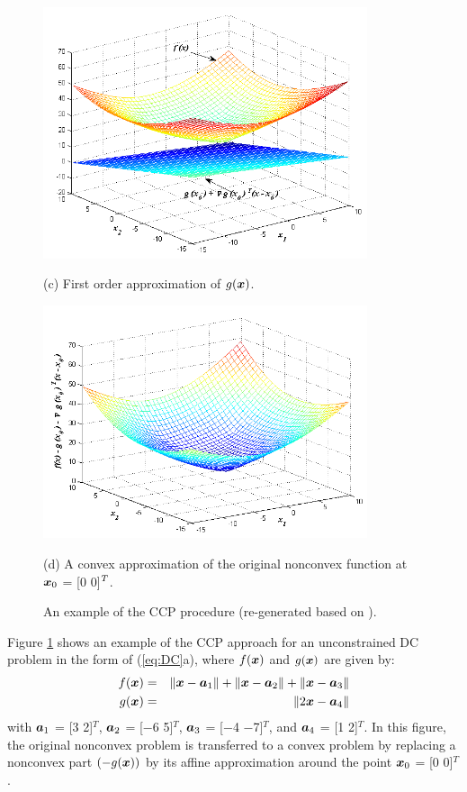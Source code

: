 \begin{figure}%
\centering
  \includegraphics[width=0.85\textwidth,height=0.45\textheight]{figures/ccp/ccp_c}
  
  (c) First order approximation of $g(\protect\mbox{\boldmath$x$})$.%
  
  \includegraphics[width=0.85\textwidth,height=0.45\textheight]{figures/ccp/ccp_d}
  
  (d) A convex approximation of the original nonconvex function at $\protect\mbox{\boldmath$x$}_0$ = [0 0]$\protect^T$. 
\caption{An example of the CCP procedure (re-generated based on \cite{clock}).}
\label{fig:ExampleCCP}
\end{figure}

Figure \ref{fig:ExampleCCP} shows an example of the CCP approach for an unconstrained DC problem in the form of (\ref{eq:DC}a), where $f(\mbox{\boldmath$x$})$ and  $g(\mbox{\boldmath$x$})$ are given by:
\begin{eqnarray}
\nonumber
f(\mbox{\boldmath$x$}) & = & \|\mbox{\boldmath$x$} - \mbox{\boldmath$a$}_1\| + \|\mbox{\boldmath$x$} - \mbox{\boldmath$a$}_2\| + \|\mbox{\boldmath$x$} - \mbox{\boldmath$a$}_3\| \\
\nonumber
g(\mbox{\boldmath$x$}) & = & \|2\mbox{\boldmath$x$} - \mbox{\boldmath$a$}_4\|
\end{eqnarray}
with $\mbox{\boldmath$a$}_1$ = [3 2]$^T$, $\mbox{\boldmath$a$}_2$ = [−6 5]$^T$, $\mbox{\boldmath$a$}_3$ = [−4 −7]$^T$, and $\mbox{\boldmath$a$}_4$ = [1 2]$^T$. In this figure, the original nonconvex problem is transferred to a convex problem by replacing a nonconvex part $(-g(\mbox{\boldmath$x$}))$ by its affine approximation around the point $\mbox{\boldmath$x$}_0$ = [0 0]$^T$.


